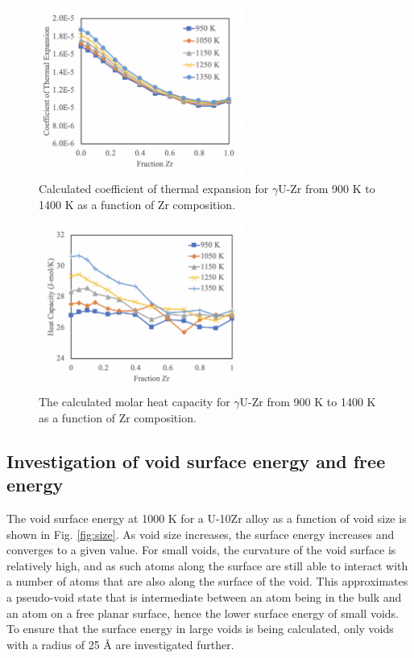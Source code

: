 \documentclass[review]{elsarticle}
\begin{document}
\begin{figure}[!htp]
\begin{center}
\includegraphics[width=0.6\textwidth]{4_Texp}
\end{center}
\caption{Calculated coefficient of thermal expansion for $\gamma$U-Zr from 900 K to 1400 K as a function of Zr composition.  }
\label{fig:Texp}
\end{figure}


\begin{figure}[!htp]
\begin{center}
\includegraphics[width=0.6\textwidth]{5_Cp}
\end{center}
\caption{The calculated molar heat capacity for $\gamma$U-Zr from 900 K to 1400 K as a function of Zr composition. }
\label{fig:cp}
\end{figure}

\FloatBarrier

\subsection{Investigation of void surface energy and free energy}\label{sec:res2}

The void surface energy at 1000 K for a U-10Zr alloy as a function of void size is shown in Fig. \ref{fig:size}. As void size increases, the surface energy increases and converges to a given value. For small voids, the curvature of the void surface is relatively high, and as such atoms along the surface are still able to interact with a number of atoms that are also along the surface of the void. This approximates a pseudo-void state that is intermediate between an atom being in the bulk and an atom on a free planar surface, hence the lower surface energy of small voids. To ensure that the surface energy in large voids is being calculated, only voids with a radius of 25 {\AA} are investigated further. 
\end{document}
